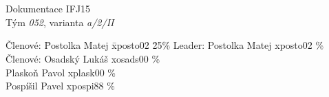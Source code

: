 \documentclass[a4paper, 12pt]{article}
\begin{document}
\begin{titlepage}

\begin{center}
\fontsize{25}{20}\\
\fontsize{21}{0}\textsc{\selectfont{Fakulta informačních technologií}}\\
\begin{figure}[ht]
    \begin{center}
    \end{center}
\end{figure}

\LARGE{Dokumentace IFJ15}\\
\Large{Tým \textit{052}, varianta \textit{a/2/II}}
\end{center}

\begin{large}
\begin{tabbing}
    Členové: \= Postolka Matej \quad \= xposto02 \quad \= 25\%\kill
    Leader:  \> Postolka Matej \> xposto02 \% \\
    Členové: \> Osadský Lukáš  \> xosads00 \% \\
             \> Plaskoň Pavol  \> xplask00 \% \\
             \> Pospíšil Pavel \> xpospi88 \% \\
\end{tabbing}
\end{large}

\end{titlepage}

\tableofcontents
\newpage
\end{document}
